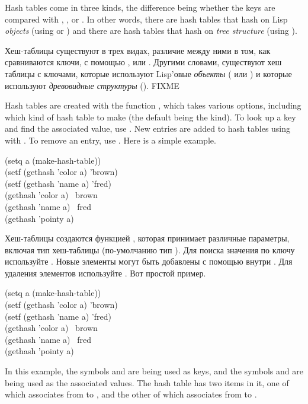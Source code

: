 Hash tables come in three kinds, the difference being whether the keys
are compared with , , or .  In other words, there
are hash tables that hash on Lisp \emph{objects} (using  or )
and there are hash tables that hash on \emph{tree structure}
(using ).

Хеш-таблицы существуют в трех видах, различие между ними в том, как сравниваются
ключи, с помощью ,  или . Другими словами,
существуют хеш таблицы с ключами, которые используют Lisp'овые \emph{объекты}
( или ) и которые используют \emph{древовидные структуры}
(). FIXME

Hash tables are created with the function
, which takes various options, including
which kind of hash table to make (the default being the  kind).
To look up a key and find
the associated value, use .
New entries are added
to hash tables using  with .
To remove an entry, use .  Here is a simple example.
\begin{lisp}
(setq a (make-hash-table)) \\
(setf (gethash 'color a) 'brown) \\
(setf (gethash 'name a) 'fred) \\
(gethash 'color a) \EV\ brown \\
(gethash 'name a) \EV\ fred \\
(gethash 'pointy a) \EV\ {\false}
\end{lisp}

Хеш-таблицы создаются функцией , которая принимает
различные параметры, включая тип хеш-таблицы (по-умолчанию тип ).
Для поиска значения по ключу используйте .
Новые элементы могут быть добавлены с помощью  внутри .
Для удаления элементов используйте . Вот простой пример.
\begin{lisp}
(setq a (make-hash-table)) \\
(setf (gethash 'color a) 'brown) \\
(setf (gethash 'name a) 'fred) \\
(gethash 'color a) \EV\ brown \\
(gethash 'name a) \EV\ fred \\
(gethash 'pointy a) \EV\ {\false}
\end{lisp}

In this example, the symbols  and  are being used as
keys, and the symbols  and  are being used as the
associated values.  The hash table has two items in it, one of which
associates from  to , and the other of which
associates from  to .

